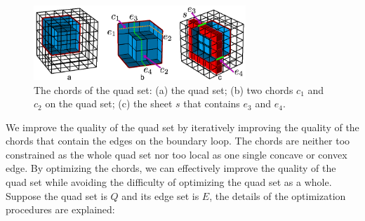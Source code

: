 \documentclass[final,5p,times,twocolumn]{elsarticle}
\begin{document}
\begin{figure}[htbp]
\begin{center}
\includegraphics[width=8cm]{figures/qs_dual.png}
\caption{The chords of the quad set: (a) the quad set; (b) two chords $c_1$ and $c_2$ on the quad set; (c) the sheet $s$ that contains $e_3$ and $e_4$.}
\label{fig:qs_dual}
\end{center}
\end{figure}

We improve the quality of the quad set by iteratively improving the quality of the chords that contain the edges on the boundary loop. The chords are neither too constrained as the whole quad set nor too local as one single concave or convex edge. By optimizing the chords, we can effectively improve the quality of the quad set while avoiding the difficulty of optimizing the quad set as a whole. Suppose the quad set is $Q$ and its edge set is $E$, the details of the optimization procedures are explained:
\end{document}
